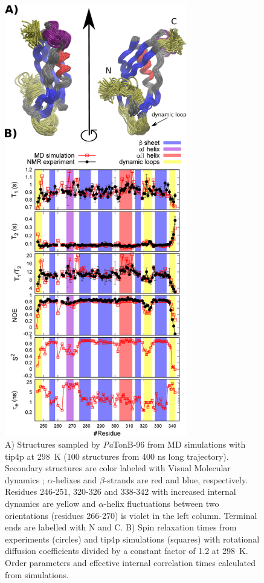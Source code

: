 \documentclass[journal=jpcbfk,manuscript=article]{achemso}
\begin{document}
\begin{figure}[p]
  \includegraphics[width=8.0cm]{../Figs/RELdataPsTonB2.eps}%
  \caption{A) Structures sampled by {\it Pa}TonB-96 from MD simulations with tip4p at 298~K
    (100 structures from 400 ns long trajectory). Secondary structures
    are color labeled with Visual Molecular dynamics \cite{frishman95,humphrey96};
    $\alpha$-helixes and $\beta$-strands are red and blue, respectively.
    Residues 246-251, 320-326 and 338-342 with increased internal dynamics are yellow and
    $\alpha$-helix fluctuations between two orientations (residues 266-270) is violet in the left column.
    Terminal ends are labelled with N and C.
    B) Spin relaxation times from experiments (circles) and tip4p
    simulations (squares) with rotational diffusion coefficients divided by a
    constant factor of 1.2 at 298~K. Order parameters and effective internal correlation
    times calculated from simulations. \label{PsTonBrelaxationDATAscaled}}%
\end{figure}
\end{document}
